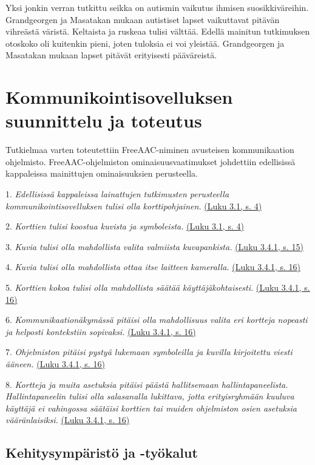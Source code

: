 \documentclass[utf8]{gradu3}
\begin{document}
\label{AAC-colors}
Yksi jonkin verran tutkittu seikka on autismin vaikutus ihmisen suosikkiväreihin. Grandgeorgen ja Masatakan \parencite[]{color-preference-autism} mukaan autistiset lapset vaikuttavat pitävän vihreästä väristä. Keltaista ja ruskeaa tulisi välttää. Edellä mainitun tutkimuksen otoskoko oli kuitenkin pieni, joten tuloksia ei voi yleistää. Grandgeorgen ja Masatakan mukaan lapset pitävät erityisesti pääväreistä.

\chapter{Kommunikointisovelluksen suunnittelu ja toteutus}

Tutkielmaa varten toteutettiin FreeAAC-niminen avusteisen kommunikaation ohjelmisto. FreeAAC-ohjelmiston ominaisuusvaatimukset johdettiin edellisissä kappaleissa mainittujen ominaisuuksien perusteella.

1. \textit{Edellisissä kappaleissa lainattujen tutkimusten perusteella kommunikointisovelluksen tulisi olla korttipohjainen.} \hyperref[AAC-cards]{(Luku 3.1, s. 4)}

2. \textit{Korttien tulisi koostua kuvista ja symboleista.} \hyperref[AAC-symbols]{(Luku 3.1, s. 4)}

3. \textit{Kuvia tulisi olla mahdollista valita valmiista kuvapankista.} \hyperref[symbol-libraries]{(Luku 3.4.1, s. 15)}

4. \textit{Kuvia tulisi olla mahdollista ottaa itse laitteen kameralla.} \hyperref[AAC-photos]{(Luku 3.4.1, s. 16)}

5. \textit{Korttien kokoa tulisi olla mahdollista säätää käyttäjäkohtaisesti.} \hyperref[AAC-cardsize]{(Luku 3.4.1, s. 16)}

6. \textit{Kommunikaationäkymässä pitäisi olla mahdollisuus valita eri kortteja nopeasti ja helposti kontekstiin sopivaksi.} \hyperref[AAC-cardsize]{(Luku 3.4.1, s. 16)}

7. \textit{Ohjelmiston pitäisi pystyä lukemaan symboleilla ja kuvilla kirjoitettu viesti ääneen.} \hyperref[AAC-soundsynth]{(Luku 3.4.1, s. 16)}

8. \textit{Kortteja ja muita asetuksia pitäisi päästä hallitsemaan hallintapaneelista. Hallintapaneelin tulisi olla salasanalla lukittava, jotta erityisryhmään kuuluva käyttäjä ei vahingossa säätäisi korttien tai muiden ohjelmiston osien asetuksia vääränlaisiksi.} \hyperref[AAC-settings]{(Luku 3.4.1, s. 16)}

\section{Kehitysympäristö ja -työkalut}
\end{document}
